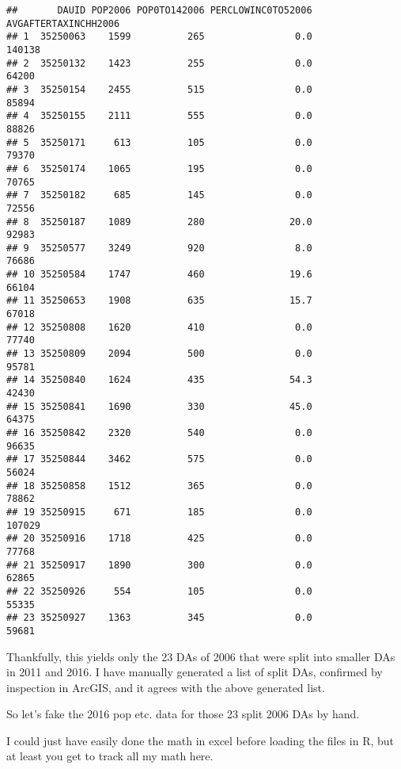 \documentclass[]{article}
\begin{document}
\begin{verbatim}
##       DAUID POP2006 POP0TO142006 PERCLOWINC0TO52006 AVGAFTERTAXINCHH2006
## 1  35250063    1599          265                0.0               140138
## 2  35250132    1423          255                0.0                64200
## 3  35250154    2455          515                0.0                85894
## 4  35250155    2111          555                0.0                88826
## 5  35250171     613          105                0.0                79370
## 6  35250174    1065          195                0.0                70765
## 7  35250182     685          145                0.0                72556
## 8  35250187    1089          280               20.0                92983
## 9  35250577    3249          920                8.0                76686
## 10 35250584    1747          460               19.6                66104
## 11 35250653    1908          635               15.7                67018
## 12 35250808    1620          410                0.0                77740
## 13 35250809    2094          500                0.0                95781
## 14 35250840    1624          435               54.3                42430
## 15 35250841    1690          330               45.0                64375
## 16 35250842    2320          540                0.0                96635
## 17 35250844    3462          575                0.0                56024
## 18 35250858    1512          365                0.0                78862
## 19 35250915     671          185                0.0               107029
## 20 35250916    1718          425                0.0                77768
## 21 35250917    1890          300                0.0                62865
## 22 35250926     554          105                0.0                55335
## 23 35250927    1363          345                0.0                59681
\end{verbatim}

Thankfully, this yields only the 23 DAs of 2006 that were split into
smaller DAs in 2011 and 2016. I have manually generated a list of split
DAs, confirmed by inspection in ArcGIS, and it agrees with the above
generated list.

So let's fake the 2016 pop etc. data for those 23 split 2006 DAs by
hand.

I could just have easily done the math in excel before loading the files
in R, but at least you get to track all my math here.
\end{document}
